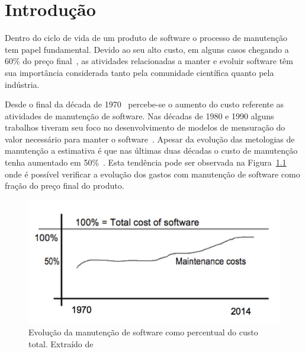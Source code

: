 \chapter{Introdução}
\label{ch:intro}

Dentro do ciclo de vida de um produto de software o processo de manutenção tem
papel fundamental. Devido ao seu alto custo, em alguns casos chegando a 60\% do
preço final~\cite{kaur2015review}, as atividades relacionadas a manter e evoluir
software têm sua importância considerada tanto pela comunidade científica quanto
pela indústria.

Desde o final da década de 1970~\cite{Zelkowitz:1979:PSE:578504} percebe-se o
aumento do custo referente as atividades de  manutenção de software. Nas décadas
de 1980 e 1990 alguns trabalhos tiveram seu foco no desenvolvimento de modelos
de mensuração do valor necessário para manter o
software~\cite{Herrin:1985:SMC:323287.323383,hirota1994approach}. Apesar da
evolução das metologias de manutenção a estimativa é que nas últimas duas
décadas o custo de manutenção tenha aumentado em
50\%~\cite{koskinen2010software}. Esta tendência pode ser observada na
Figura~\ref{fig:software-maintence-costs} onde é possível verificar a evolução
dos gastos com manutenção de software como fração do preço final do produto.

\begin{figure}[htpb]
\centering
\includegraphics[width=0.7\linewidth]
				{./chapter-intro/img/software-maintence-costs.png}
\caption{Evolução da manutenção de software como percentual do custo total.
	Extraído de~\cite{engelbertink2010save}}
\label{fig:software-maintence-costs}
\end{figure}

